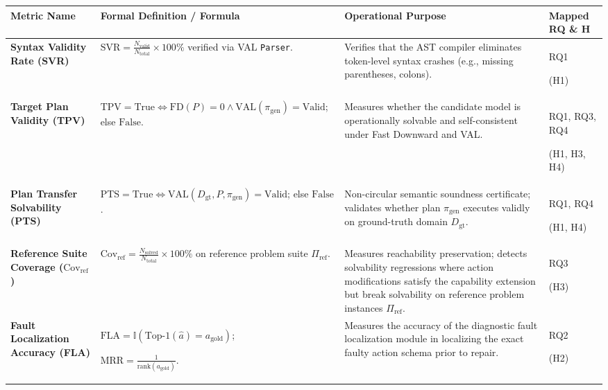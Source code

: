 \documentclass[11pt,a4paper]{article}
\begin{document}
\begin{table}[H]
\centering
\footnotesize
\renewcommand{\arraystretch}{1.05}
\begin{tabularx}{\textwidth}{
  >{\raggedright\arraybackslash}p{2.6cm}
  >{\raggedright\arraybackslash}X
  >{\raggedright\arraybackslash}X
  >{\centering\arraybackslash}p{2.0cm}
}
\toprule
\textbf{Metric Name} & \textbf{Formal Definition / Formula} & \textbf{Operational Purpose} & \textbf{Mapped RQ \& H} \\
\midrule
\textbf{Syntax Validity Rate (SVR)} & 
$\text{SVR} = \frac{N_{\text{valid}}}{N_{\text{total}}} \times 100\%$ verified via VAL \texttt{Parser}. & 
Verifies that the AST compiler eliminates token-level syntax crashes (e.g., missing parentheses, colons). & 
RQ1 \par (H1) \\

\textbf{Target Plan Validity (TPV)} & 
$\text{TPV} = \text{True} \iff \text{FD}(P) = 0 \land \text{VAL}(\pi_{\text{gen}}) = \text{Valid}$; else $\text{False}$. & 
Measures whether the candidate model is operationally solvable and self-consistent under Fast Downward and VAL. & 
RQ1, RQ3, RQ4 \par (H1, H3, H4) \\

\textbf{Plan Transfer Solvability (PTS)} & 
$\text{PTS} = \text{True} \iff \text{VAL}(D_{\text{gt}}, P, \pi_{\text{gen}}) = \text{Valid}$; else $\text{False}$. & 
Non-circular semantic soundness certificate; validates whether plan $\pi_{\text{gen}}$ executes validly on ground-truth domain $D_{\text{gt}}$. & 
RQ1, RQ4 \par (H1, H4) \\

\textbf{Reference Suite Coverage ($\text{Cov}_{\text{ref}}$)} & 
$\text{Cov}_{\text{ref}} = \frac{N_{\text{solved}}}{N_{\text{total}}} \times 100\%$ on reference problem suite $\Pi_{\text{ref}}$. & 
Measures reachability preservation; detects solvability regressions where action modifications satisfy the capability extension but break solvability on reference problem instances $\Pi_{\text{ref}}$. & 
RQ3 \par (H3) \\

\textbf{Fault Localization Accuracy (FLA)} & 
$\text{FLA} = \mathbb{I}(\text{Top-1}(\hat{a}) = a_{\text{gold}})$; \par $\text{MRR} = \frac{1}{\text{rank}(a_{\text{gold}})}$. & 
Measures the accuracy of the diagnostic fault localization module in localizing the exact faulty action schema prior to repair. & 
RQ2 \par (H2) \\


\end{tabularx}
\end{table}
\end{document}
